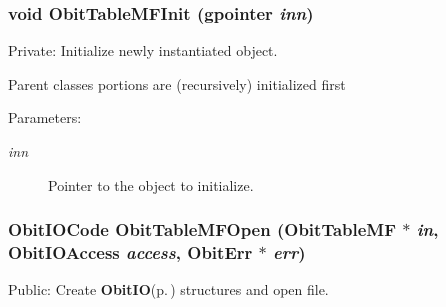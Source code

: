 \subsubsection{\setlength{\rightskip}{0pt plus 5cm}void Obit\-Table\-MFInit (gpointer {\em inn})}\label{ObitTableMF_8c_a8}


Private: Initialize newly instantiated object. 

Parent classes portions are (recursively) initialized first \begin{Desc}
\item[Parameters:]
\begin{description}
\item[{\em inn}]Pointer to the object to initialize. \end{description}
\end{Desc}
\subsubsection{\setlength{\rightskip}{0pt plus 5cm}Obit\-IOCode Obit\-Table\-MFOpen ({\bf Obit\-Table\-MF} $\ast$ {\em in}, Obit\-IOAccess {\em access}, {\bf Obit\-Err} $\ast$ {\em err})}\label{ObitTableMF_8c_a21}


Public: Create {\bf Obit\-IO}{\rm (p.\,\pageref{structObitIO})} structures and open file. 

